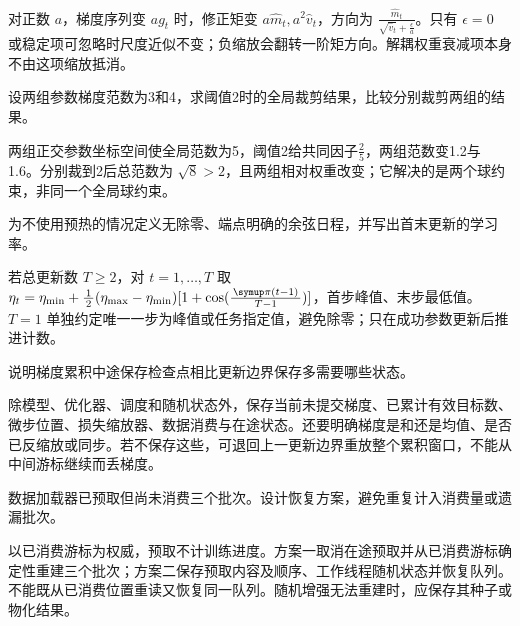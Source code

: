\begin{exercises}
\begin{exercise}
\begin{solution}
对正数 $a$，梯度序列变 $ag_t$ 时，修正矩变 $a\widehat m_t,a^2\widehat v_t$，方向为 $\frac{\widehat m_t}{\sqrt{\widehat v_t}+\frac{\epsilon}{a}}$。只有 $\epsilon=0$ 或稳定项可忽略时尺度近似不变；负缩放会翻转一阶矩方向。解耦权重衰减项本身不由这项缩放抵消。
\end{solution}
\end{exercise}

\begin{exercise} 设两组参数梯度范数为3和4，求阈值2时的全局裁剪结果，比较分别裁剪两组的结果。

\begin{solution}
两组正交参数坐标空间使全局范数为5，阈值2给共同因子$\frac{2}{5}$，两组范数变1.2与1.6。分别裁到2后总范数为 $\sqrt8>2$，且两组相对权重改变；它解决的是两个球约束，非同一个全局球约束。
\end{solution}
\end{exercise}

\begin{exercise} 为不使用预热的情况定义无除零、端点明确的余弦日程，并写出首末更新的学习率。

\begin{solution}
若总更新数 $T\ge2$，对 $t=1,\ldots,T$ 取 $\eta_t=\eta_{\min}+\frac12(\eta_{\max}-\eta_{\min})[1+\cos(\frac{\constpi{}(t-1)}{T-1})]$，首步峰值、末步最低值。$T=1$ 单独约定唯一一步为峰值或任务指定值，避免除零；只在成功参数更新后推进计数。
\end{solution}
\end{exercise}

\begin{exercise} 说明梯度累积中途保存检查点相比更新边界保存多需要哪些状态。

\begin{solution}
除模型、优化器、调度和随机状态外，保存当前未提交梯度、已累计有效目标数、微步位置、损失缩放器、数据消费与在途状态。还要明确梯度是和还是均值、是否已反缩放或同步。若不保存这些，可退回上一更新边界重放整个累积窗口，不能从中间游标继续而丢梯度。
\end{solution}
\end{exercise}

\begin{exercise} 数据加载器已预取但尚未消费三个批次。设计恢复方案，避免重复计入消费量或遗漏批次。

\begin{solution}
以已消费游标为权威，预取不计训练进度。方案一取消在途预取并从已消费游标确定性重建三个批次；方案二保存预取内容及顺序、工作线程随机状态并恢复队列。不能既从已消费位置重读又恢复同一队列。随机增强无法重建时，应保存其种子或物化结果。
\end{solution}
\end{exercise}


\end{exercises}

